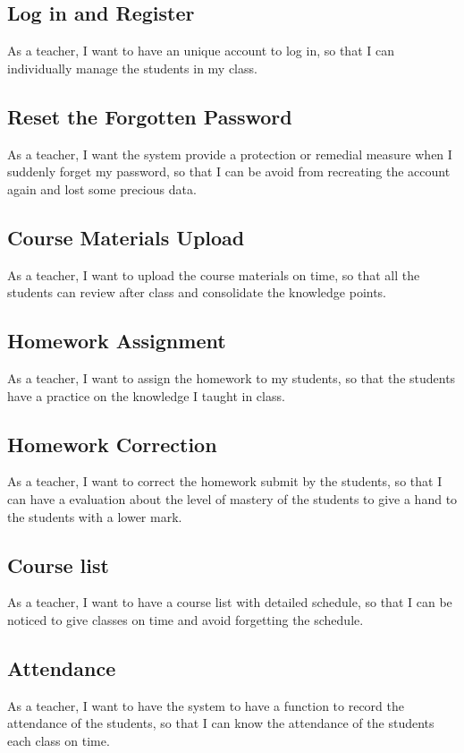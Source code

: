 \subsection{Log in and Register}
As a teacher, I want to have an unique account to log in, so that I can individually manage the students in my class.
\subsection{Reset the Forgotten Password}
As a teacher, I want the system provide a protection or remedial measure when I suddenly forget my password, so that I can be avoid from recreating  the account again and lost some precious data.
\subsection{Course Materials Upload}
As a teacher, I want to upload the course materials on time, so that all the students can review after class and consolidate the knowledge points.
\subsection{Homework Assignment}
As a teacher, I want to assign the homework to my students, so that the students have a practice on the knowledge I taught in class.
\subsection{Homework Correction}
As a teacher, I want to correct the homework submit by the students, so that I can have a evaluation about the level of mastery of the students to give a hand to the students with a lower mark. 
\subsection{Course list}
As a teacher, I want to have a course list with detailed schedule, so that I can be noticed to give classes on time and avoid forgetting the schedule.
\subsection{Attendance}
As a teacher, I want to have the system to have a function to record the attendance of the students, so that I can know the attendance of the students each class on time. \\